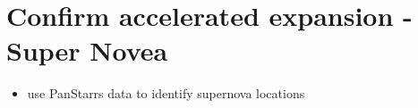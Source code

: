 \documentclass[aps,prl,twocolumn,superscriptaddress]{revtex4-1}
\begin{document}
\section{Confirm accelerated expansion - Super Novea}
\begin{itemize}
	\item{} use PanStarrs data to identify supernova locations
\end{itemize}








\setlength{\parindent}{0cm}

\begin{thebibliography}{99}  %


\end{thebibliography}
\end{document}
